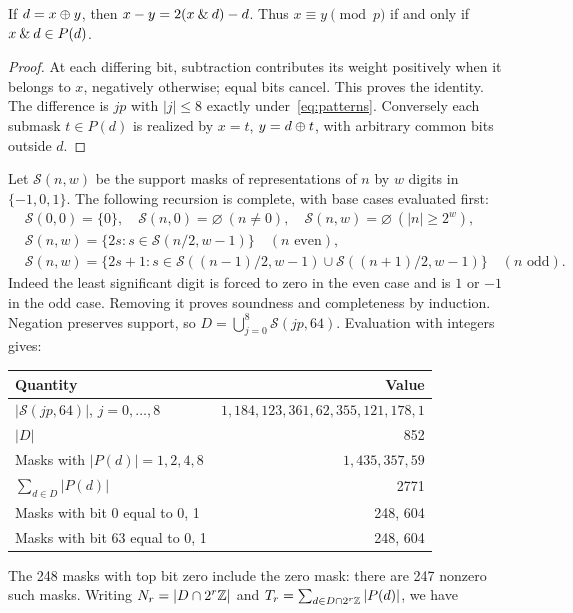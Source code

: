 \begin{lemma}\label{lem:mask}
If $d=x\mathbin\oplus y$, then $x-y=2(x\mathbin{\&} d)-d$. Thus $x\equiv y\pmod p$ if and only if $x\mathbin{\&} d\in P(d)$.
\end{lemma}
\begin{proof}
At each differing bit, subtraction contributes its weight positively when it belongs to $x$, negatively otherwise; equal bits cancel. This proves the identity. The difference is $jp$ with $|j|\le8$ exactly under~\eqref{eq:patterns}. Conversely each submask $t\in P(d)$ is realized by $x=t$, $y=d\mathbin\oplus t$, with arbitrary common bits outside $d$.
\end{proof}

Let $\mathcal S(n,w)$ be the support masks of representations of $n$ by $w$ digits in $\{-1,0,1\}$. The following recursion is complete, with base cases evaluated first:
\begin{equation}\label{eq:signed}
\begin{aligned}
 &\mathcal S(0,0)=\{0\},\quad \mathcal S(n,0)=\varnothing\ (n\ne0),\quad
 \mathcal S(n,w)=\varnothing\ (|n|\ge2^w),\\
 &\mathcal S(n,w)=\{2s:s\in\mathcal S(n/2,w-1)\}\quad(n\text{ even}),\\
 &\mathcal S(n,w)=\{2s+1:s\in\mathcal S((n-1)/2,w-1)\cup
 \mathcal S((n+1)/2,w-1)\}\quad(n\text{ odd}).
\end{aligned}
\end{equation}
Indeed the least significant digit is forced to zero in the even case and is $1$ or $-1$ in the odd case. Removing it proves soundness and completeness by induction. Negation preserves support, so $D=\bigcup_{j=0}^8\mathcal S(jp,64)$. Evaluation with integers gives:
\begin{center}
\begin{tabular}{@{}lr@{}}\toprule
Quantity&Value\\\midrule
$|\mathcal S(jp,64)|$, $j=0,\ldots,8$&$1,184,123,361,62,355,121,178,1$\\
$|D|$&852\\
Masks with $|P(d)|=1,2,4,8$&$1,435,357,59$\\
$\sum_{d\in D}|P(d)|$&2771\\
Masks with bit 0 equal to 0, 1&248, 604\\
Masks with bit 63 equal to 0, 1&248, 604\\\bottomrule
\end{tabular}
\end{center}
The 248 masks with top bit zero include the zero mask: there are 247 nonzero such masks. Writing $N_r=|D\cap2^r\mathbb Z|$ and $T_r=\sum_{d\in D\cap2^r\mathbb Z}|P(d)|$, we have
